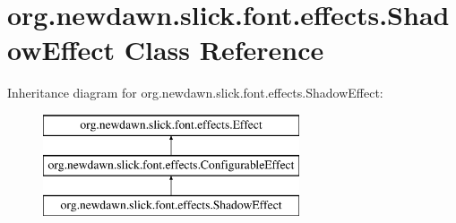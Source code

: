 \hypertarget{classorg_1_1newdawn_1_1slick_1_1font_1_1effects_1_1_shadow_effect}{}\section{org.\+newdawn.\+slick.\+font.\+effects.\+Shadow\+Effect Class Reference}
\label{classorg_1_1newdawn_1_1slick_1_1font_1_1effects_1_1_shadow_effect}
Inheritance diagram for org.\+newdawn.\+slick.\+font.\+effects.\+Shadow\+Effect\+:\begin{figure}[H]
\begin{center}
\leavevmode
\includegraphics[height=3.000000cm]{classorg_1_1newdawn_1_1slick_1_1font_1_1effects_1_1_shadow_effect}
\end{center}
\end{figure}
